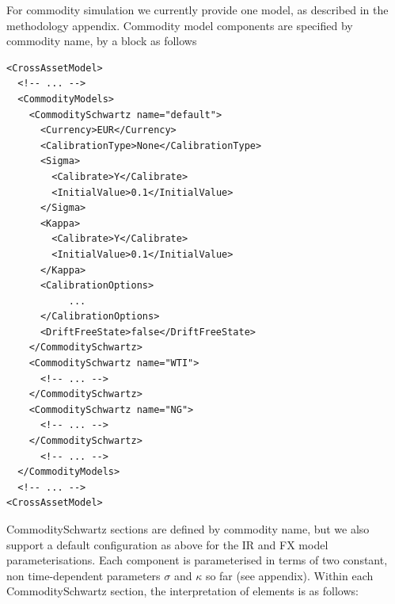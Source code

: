 

For commodity simulation we currently provide one model, as described in the methodology appendix.
Commodity model components are specified by commodity name, by a block as follows

\begin{listing}[H]
\begin{verbatim}
<CrossAssetModel>
  <!-- ... -->
  <CommodityModels>
    <CommoditySchwartz name="default">
      <Currency>EUR</Currency>
      <CalibrationType>None</CalibrationType>
      <Sigma>
        <Calibrate>Y</Calibrate>
        <InitialValue>0.1</InitialValue>
      </Sigma>
      <Kappa>
        <Calibrate>Y</Calibrate>
        <InitialValue>0.1</InitialValue>
      </Kappa>
      <CalibrationOptions>
           ...
      </CalibrationOptions>
      <DriftFreeState>false</DriftFreeState>
    </CommoditySchwartz>
    <CommoditySchwartz name="WTI">
      <!-- ... -->
    </CommoditySchwartz>
    <CommoditySchwartz name="NG">
      <!-- ... -->
    </CommoditySchwartz>
      <!-- ... -->
  </CommodityModels>
  <!-- ... -->
<CrossAssetModel>
\end{verbatim}
\caption{Simulation model commodity configuration}
\label{lst:simulation_model_com_configuration}
\end{listing}

CommoditySchwartz sections are defined by commodity name, but we also support a default configuration as above for the IR and
FX model parameterisations.  Each component is parameterised in terms of two constant, non time-dependent parameters $\sigma$ and $\kappa$ so far (see appendix).
Within each CommoditySchwartz section, the interpretation of elements is as follows:

